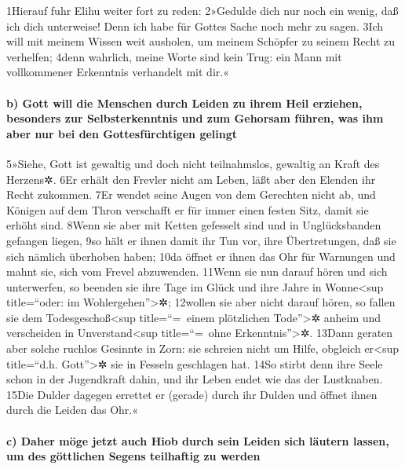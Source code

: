 1Hierauf fuhr Elihu weiter fort zu reden: 2»Gedulde dich nur noch ein
wenig, daß ich dich unterweise! Denn ich habe für Gottes Sache noch mehr
zu sagen. 3Ich will mit meinem Wissen weit ausholen, um meinem Schöpfer
zu seinem Recht zu verhelfen; 4denn wahrlich, meine Worte sind kein
Trug: ein Mann mit vollkommener Erkenntnis verhandelt mit dir.«

\hypertarget{b-gott-will-die-menschen-durch-leiden-zu-ihrem-heil-erziehen-besonders-zur-selbsterkenntnis-und-zum-gehorsam-fuxfchren-was-ihm-aber-nur-bei-den-gottesfuxfcrchtigen-gelingt}{%
\paragraph{b) Gott will die Menschen durch Leiden zu ihrem Heil
erziehen, besonders zur Selbsterkenntnis und zum Gehorsam führen, was
ihm aber nur bei den Gottesfürchtigen
gelingt}\label{b-gott-will-die-menschen-durch-leiden-zu-ihrem-heil-erziehen-besonders-zur-selbsterkenntnis-und-zum-gehorsam-fuxfchren-was-ihm-aber-nur-bei-den-gottesfuxfcrchtigen-gelingt}}

5»Siehe, Gott ist gewaltig und doch nicht teilnahmslos, gewaltig an
Kraft des Herzens✲. 6Er erhält den Frevler nicht am Leben, läßt aber den
Elenden ihr Recht zukommen. 7Er wendet seine Augen von dem Gerechten
nicht ab, und Königen auf dem Thron verschafft er für immer einen festen
Sitz, damit sie erhöht sind. 8Wenn sie aber mit Ketten gefesselt sind
und in Unglücksbanden gefangen liegen, 9so hält er ihnen damit ihr Tun
vor, ihre Übertretungen, daß sie sich nämlich überhoben haben; 10da
öffnet er ihnen das Ohr für Warnungen und mahnt sie, sich vom Frevel
abzuwenden. 11Wenn sie nun darauf hören und sich unterwerfen, so beenden
sie ihre Tage im Glück und ihre Jahre in Wonne\textless sup
title=``oder: im Wohlergehen''\textgreater✲; 12wollen sie aber nicht
darauf hören, so fallen sie dem Todesgeschoß\textless sup
title=``=~einem plötzlichen Tode''\textgreater✲ anheim und verscheiden
in Unverstand\textless sup title=``=~ohne Erkenntnis''\textgreater✲.
13Dann geraten aber solche ruchlos Gesinnte in Zorn: sie schreien nicht
um Hilfe, obgleich er\textless sup title=``d.h. Gott''\textgreater✲ sie
in Fesseln geschlagen hat. 14So stirbt denn ihre Seele schon in der
Jugendkraft dahin, und ihr Leben endet wie das der Lustknaben. 15Die
Dulder dagegen errettet er (gerade) durch ihr Dulden und öffnet ihnen
durch die Leiden das Ohr.«

\hypertarget{c-daher-muxf6ge-jetzt-auch-hiob-durch-sein-leiden-sich-luxe4utern-lassen-um-des-guxf6ttlichen-segens-teilhaftig-zu-werden}{%
\paragraph{c) Daher möge jetzt auch Hiob durch sein Leiden sich läutern
lassen, um des göttlichen Segens teilhaftig zu
werden}\label{c-daher-muxf6ge-jetzt-auch-hiob-durch-sein-leiden-sich-luxe4utern-lassen-um-des-guxf6ttlichen-segens-teilhaftig-zu-werden}}

